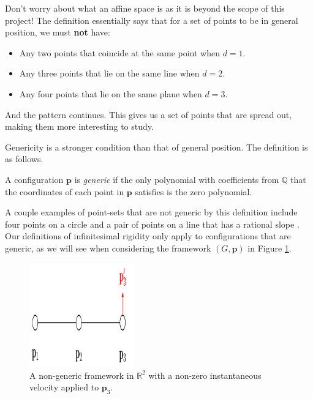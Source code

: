 \begin{flushleft}
Don't worry about what an affine space is as it is beyond the scope of this project! The definition essentially says that for a set of points to be in general position, we must \textbf{not} have:
\begin{itemize}
    \item Any two points that coincide at the same point when $d = 1$.
    \vspace{-3mm}
    \item Any three points that lie on the same line when $d = 2$.
    \vspace{-3mm}
    \item Any four points that lie on the same plane when $d = 3$.
\end{itemize}

And the pattern continues. This gives us a set of points that are spread out, making them more interesting to study.
\end{flushleft}

\begin{flushleft} %
Genericity is a stronger condition than that of general position. The definition is as follows.
\end{flushleft}

\begin{definition}
A configuration $\mathbf{p}$ is \textit{generic} if the only polynomial with coefficients from $\mathbb{Q}$ that the coordinates of each point in $\mathbf{p}$ satisfies is the zero polynomial.
\end{definition}

\begin{flushleft}
A couple examples of point-sets that are not generic by this definition include four points on a circle and a pair of points on a line that has a rational slope \cite{textbook}. Our definitions of infinitesimal rigidity only apply to configurations that are generic, as we will see when considering the framework $(G,\mathbf{p})$ in Figure \ref{fig: non-generic}.
\end{flushleft}

\begin{figure}[htbp]
    \centering
    \includegraphics[width = 0.4\textwidth]{Chapter 2/16. generically_rigid.png}
    \caption{A non-generic framework in $\mathbb{R}^2$ with a non-zero instantaneous velocity applied to $\mathbf{p}_3$.}
    \label{fig: non-generic}
\end{figure}

